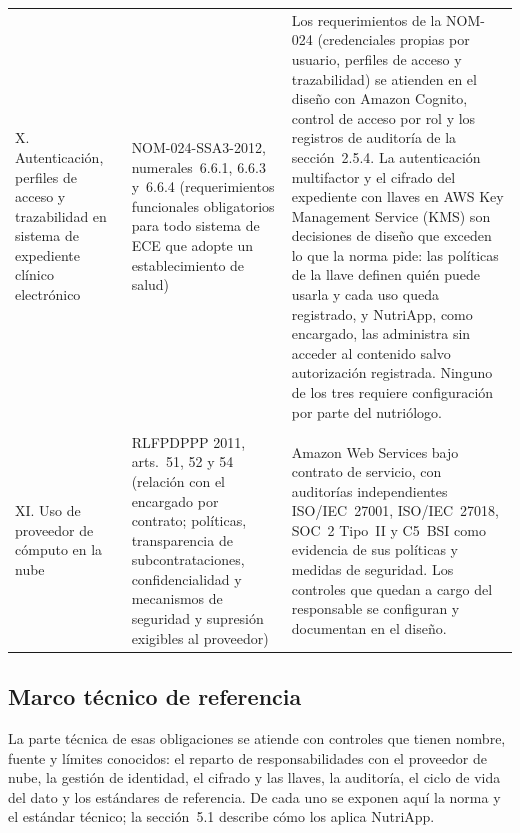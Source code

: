 \documentclass[12pt, a4paper]{article}
\begin{document}
\begin{longtable}{>{\raggedright\arraybackslash}p{2.8cm}
  >{\raggedright\arraybackslash}p{3.0cm}
  >{\raggedright\arraybackslash}p{8.5cm}}
  X. Autenticación, perfiles de acceso y trazabilidad en sistema de
  expediente clínico electrónico
    & NOM-024-SSA3-2012, numerales~6.6.1, 6.6.3 y~6.6.4 (requerimientos funcionales obligatorios
      para todo sistema de ECE que adopte un establecimiento
      de salud)
       & Los requerimientos de la NOM-024 (credenciales propias por
      usuario, perfiles de acceso y trazabilidad) se atienden en el
      diseño con Amazon Cognito, control de acceso por rol y los
      registros de auditoría de la sección~2.5.4. La autenticación
      multifactor y el cifrado del expediente con llaves en AWS Key
      Management Service (KMS) son decisiones de diseño que exceden
      lo que la norma pide: las políticas de la llave definen quién
      puede usarla y cada uso queda registrado, y NutriApp, como
      encargado, las administra sin acceder al contenido salvo
      autorización registrada. Ninguno de los tres requiere
      configuración por parte del nutriólogo. \\
  \\[4pt]

  XI. Uso de proveedor de cómputo en la nube
    & RLFPDPPP 2011, arts.~51, 52 y 54 (relación con el encargado por
      contrato; políticas, transparencia de subcontrataciones,
      confidencialidad y mecanismos de seguridad y supresión
      exigibles al proveedor)
    & Amazon Web Services bajo contrato de servicio, con auditorías
      independientes ISO/IEC~27001, ISO/IEC~27018, SOC~2 Tipo~II y
      C5~BSI como evidencia de sus políticas y medidas de seguridad.
      Los controles que quedan a cargo del responsable se
      configuran y documentan en el diseño. \\

\end{longtable}
\subsection{Marco técnico de referencia}
 
La parte técnica de esas obligaciones se atiende con controles que
tienen nombre, fuente y límites conocidos: el reparto de responsabilidades con el
proveedor de nube, la gestión de identidad, el cifrado y las
llaves, la auditoría, el ciclo de vida del dato y los estándares
de referencia. De cada uno se exponen aquí la norma y el estándar técnico; la sección~5.1 describe cómo los aplica NutriApp.
 
\end{document}
